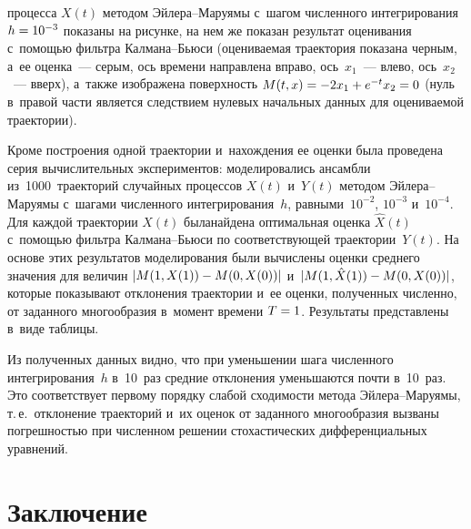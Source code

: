 \begin{multicols}{2}
\noindent
  процесса $X(t)$ методом Эй\-ле\-ра--Ма\-ру\-ямы 
с~шагом численного интегрирования $h \hm= 10^{-3}$ показаны на рисунке, 
на нем же показан результат оценивания с~по\-мощью фильтра Кал\-ма\-на--Бью\-си 
(оце\-ни\-ва\-емая траектория показана черным, а~ее оценка~--- серым, ось времени 
направлена вправо, ось~$x_1$~--- влево, ось~$x_2$~--- вверх), 
а~также изображена поверхность $M(t,x) \hm= -2 x_1 \hm+ {e}^{-t} x_2 \hm= 0$ 
(нуль в~правой час\-ти является следствием нулевых начальных данных для оцениваемой 
траектории).


Кроме построения одной траектории и~на\-хож\-де\-ния ее оценки была 
проведена серия вы\-чис\-ли\-тель\-ных экспериментов: 
моделировались ан\-самб\-ли из~1000~траекторий 
случайных процессов $X(t)$ и~$Y(t)$ методом Эй\-ле\-ра--Ма\-ру\-ямы с~шагами %
чис\-лен\-но\-го интегрирования~$h$, равными~$10^{-2}$, $10^{-3}$ и~$10^{-4}$. 
Для каждой траектории $X(t)$ была\linebreak найде\-на оптимальная оценка $\hat X(t)$ 
с~по\-мощью фильт\-ра Кал\-ма\-на--Бью\-си по соответствующей траектории~$Y(t)$. 
На основе этих результатов моделирования были вычислены оценки среднего значения 
для величин $|M(1,X(1)) \hm- M(0,X(0))|$ и~$|M(1,\hat X(1)) \hm- M(0,X(0))|$,
 которые показывают отклонения траектории и~ее оценки, полученных численно, 
 от заданного многообразия в~момент времени $T \hm= 1$. Результаты представлены в~виде 
 таб\-лицы.



Из полученных данных видно, что при уменьшении шага численного 
интегрирования~$h$ в~10~раз средние отклонения уменьшаются почти в~10~раз. 
Это соответствует первому порядку слабой сходимости метода Эй\-ле\-ра--Ма\-ру\-ямы, 
т.\,е.\ отклонение траекторий и~их оценок от заданного многообразия вызваны 
погрешностью при численном решении стохастических дифференциальных уравнений.



\section{Заключение}


\end{multicols}
